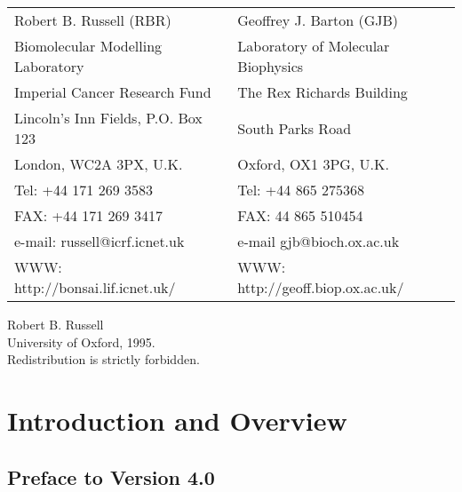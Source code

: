 \begin{titlepage}
\begin{tabular}{ll}
Robert B. Russell (RBR)		   & Geoffrey J. Barton (GJB)\\
Biomolecular Modelling Laboratory  & Laboratory of Molecular Biophysics\\
Imperial Cancer Research Fund      & The Rex Richards Building\\
Lincoln's Inn Fields, P.O. Box 123 & South Parks Road\\
London, WC2A 3PX, U.K.             & Oxford, OX1 3PG, U.K.\\
Tel: +44 171 269 3583              & Tel: +44 865 275368\\
FAX: +44 171 269 3417              & FAX: 44 865 510454\\
e-mail: russell@icrf.icnet.uk      & e-mail gjb@bioch.ox.ac.uk\\
WWW: http://bonsai.lif.icnet.uk/   & WWW: http://geoff.biop.ox.ac.uk/\\
\end{tabular}
\vskip 0.25in
\noindent
\begin{center}
Robert B. Russell\\
University of Oxford, 1995.\\
Redistribution is strictly forbidden.\\
\noindent

\end{center}

\end{titlepage}

\tableofcontents

\parindent 0in

\chapter{Introduction and Overview}

\section{Preface to Version 4.0}

